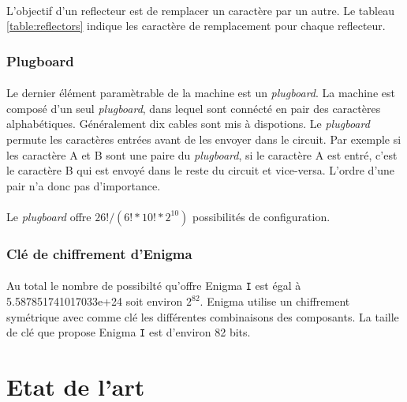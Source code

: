 \documentclass[letterpaper]{article}
\begin{document}
\paragraph{}
L'objectif d'un reflecteur est de remplacer un caractère par un autre. Le tableau \ref{table:reflectors}  indique les caractère de remplacement pour chaque reflecteur.

\subsubsection{Plugboard}
\paragraph{}
Le dernier élément paramètrable de la machine est un \textit{plugboard}. La machine est composé d'un seul \textit{plugboard}, dans lequel sont connécté en pair des caractères alphabétiques. Généralement dix cables sont mis à dispotions.
Le \textit{plugboard} permute les caractères entrées avant de les envoyer dans le circuit. Par exemple si les caractère A et B sont une paire du \textit{plugboard}, si le caractère A est entré, c'est le caractère B qui est envoyé dans le reste du circuit et vice-versa. L'ordre d'une pair n'a donc pas d'importance.

\paragraph{}
Le \textit{plugboard} offre $26! / (6!*10!*2^{10})$ possibilités de configuration.


\subsubsection{Clé de chiffrement d'Enigma}

\paragraph{}
Au total le nombre de possibilté qu'offre Enigma \texttt{I} est égal à 5.587851741017033e+24 soit environ $2^{82}$. Enigma utilise un chiffrement symétrique avec comme clé les différentes combinaisons des composants. La taille de clé que propose Enigma \texttt{I} est d'environ 82 bits.

\section{Etat de l'art}
\end{document}
